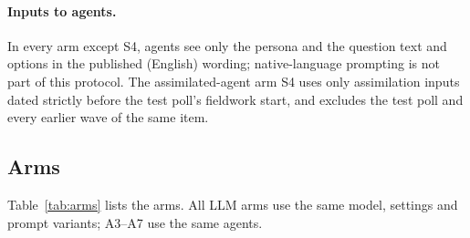 \documentclass[11pt]{article}
\begin{document}
\paragraph{Inputs to agents.} In every arm except S4, agents see only the persona and the question text and options in the published (English) wording; native-language prompting is not part of this protocol. The assimilated-agent arm S4 uses only assimilation inputs dated strictly before the test poll's fieldwork start, and excludes the test poll and every earlier wave of the same item.

\subsection{Arms}
Table~\ref{tab:arms} lists the arms. All LLM arms use the same model, settings and prompt variants; A3--A7 use the same agents.
\end{document}
